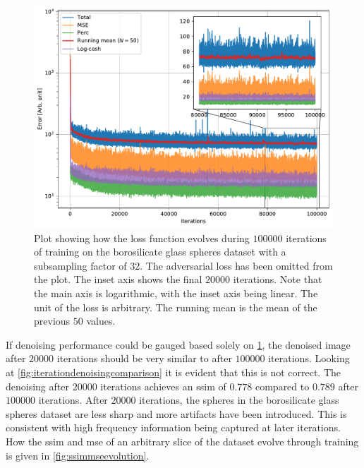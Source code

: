 \begin{figure}[htbp]
  \centering
  \includegraphics[width=.8\textwidth]{figures/losstomo00058ns32itd4mse035logcosh3depth1.pdf}
  \caption[Loss function evolution during training]{Plot showing how the loss function evolves during $100000$ iterations of training on the borosilicate glass spheres dataset with a subsampling factor of 32. The adversarial loss has been omitted from the plot. The inset axis shows the final $20000$ iterations. Note that the main axis is logarithmic, with the inset axis being linear. The unit of the loss is arbitrary. The running mean is the mean of the previous $50$ values. }
  \label{fig:losstomo00058noadv}
\end{figure}

If denoising performance could be gauged based solely on \cref{fig:losstomo00058noadv}, the denoised image after $20000$ iterations should be very similar to after $100000$ iterations. Looking at \cref{fig:iterationdenoisingcomparison} it is evident that this is not correct. The denoising after $20000$ iterations achieves an \gls{ssim} of $0.778$ compared to $0.789$ after $100000$ iterations. After $20000$ iterations, the spheres in the borosilicate glass spheres dataset are less sharp and more artifacts have been introduced. This is consistent with high frequency information being captured at later iterations. How the \gls{ssim} and \gls{mse} of an arbitrary slice of the dataset evolve through training is given in \cref{fig:ssimmseevolution}. 

